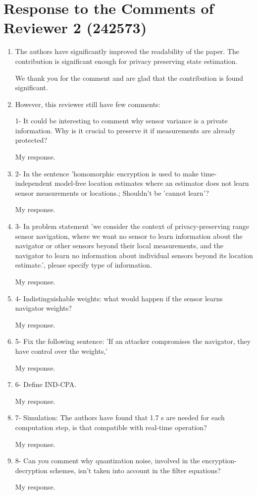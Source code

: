 \documentclass[a4paper]{scrartcl}
\newenvironment{rebuttal}{\begin{enumerate}[label={\color{grey}\thesection.\arabic{enumi}},leftmargin=0pt,ref=\thesection.\arabic{enumi}]}{\end{enumerate}}
\newcommand{\reviewtext}[1]{{\color{nblue} #1}}
\begin{document}
\section*{Response to the Comments of Reviewer 2 (242573)}
\def\thesection{R2}
\begin{rebuttal}
\item \reviewtext{The authors have significantly improved the readability of the paper. The contribution is significant enough for privacy preserving state estimation.}

We thank you for the comment and are glad that the contribution is found significant.

\item \reviewtext{However, this reviewer still have few comments:

1- It could be interesting to comment why sensor variance is a private information. Why is it crucial to preserve it if measurements are already protected?}

My response.

\item \reviewtext{2- In the sentence 'homomorphic encryption is used to make time-independent model-free location estimates where an estimator does not learn sensor measurements or locations.; Shouldn't be 'cannot learn'?}

My response.

\item \reviewtext{3- In problem statement 'we consider the context of privacy-preserving range sensor navigation, where we want no sensor to learn information about the navigator or other sensors beyond their local measurements, and the navigator to learn no information about individual sensors beyond its location estimate.', please specify type of information.}

My response.

\item \reviewtext{4- Indistinguishable weights: what would happen if the sensor learns navigator weights?}

My response.

\item \reviewtext{5- Fix the following sentence: 'If an attacker compromises the navigator, they have control over the weights,'}

My response.

\item \reviewtext{6- Define IND-CPA.}

My response.

\item \reviewtext{7- Simulation: The authors have found that 1.7 s are needed for each
computation step, is that compatible with real-time operation?}

My response.

\item \reviewtext{8- Can you comment why quantization noise, involved in the encryption-decryption schemes, isn't taken into account in the filter equations?}

My response.

\end{rebuttal}
\end{document}
